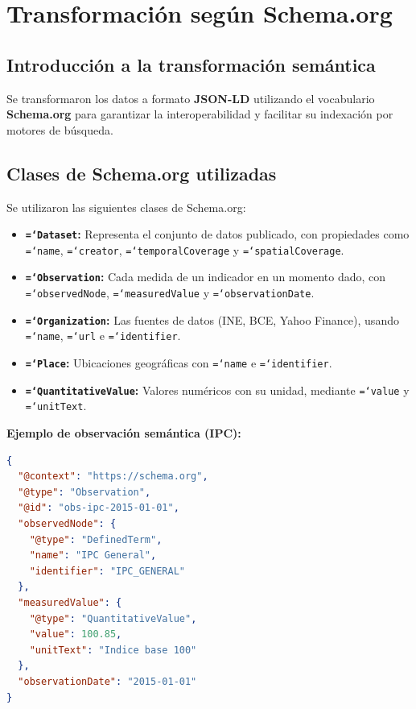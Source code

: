 \documentclass{article}
\let\oldtexttt\texttt  %
\renewcommand{\texttt}[1]{{\footnotesize\oldtexttt{\hyphenchar\font=`\-#1}}}  %
\begin{document}
\section{Transformaci\'on seg\'un Schema.org}

\subsection{Introducci\'on a la transformaci\'on sem\'antica}

Se transformaron los datos a formato \textbf{JSON-LD} utilizando el vocabulario \textbf{Schema.org} para garantizar la interoperabilidad y facilitar su indexaci\'on por motores de b\'usqueda.

\subsection{Clases de Schema.org utilizadas}

Se utilizaron las siguientes clases de Schema.org:
\begin{itemize}
    \item \textbf{\texttt{Dataset}:} Representa el conjunto de datos publicado, con propiedades como \texttt{name}, \texttt{creator}, \texttt{temporalCoverage} y \texttt{spatialCoverage}.
    \item \textbf{\texttt{Observation}:} Cada medida de un indicador en un momento dado, con \texttt{observedNode}, \texttt{measuredValue} y \texttt{observationDate}.
    \item \textbf{\texttt{Organization}:} Las fuentes de datos (INE, BCE, Yahoo Finance), usando \texttt{name}, \texttt{url} e \texttt{identifier}.
    \item \textbf{\texttt{Place}:} Ubicaciones geogr\'aficas con \texttt{name} e \texttt{identifier}.
    \item \textbf{\texttt{QuantitativeValue}:} Valores num\'ericos con su unidad, mediante \texttt{value} y \texttt{unitText}.
\end{itemize}

\textbf{Ejemplo de observaci\'on sem\'antica (IPC):}
\begin{lstlisting}[language=json]
{
  "@context": "https://schema.org",
  "@type": "Observation",
  "@id": "obs-ipc-2015-01-01",
  "observedNode": {
    "@type": "DefinedTerm",
    "name": "IPC General",
    "identifier": "IPC_GENERAL"
  },
  "measuredValue": {
    "@type": "QuantitativeValue",
    "value": 100.85,
    "unitText": "Indice base 100"
  },
  "observationDate": "2015-01-01"
}
\end{lstlisting}
\end{document}
